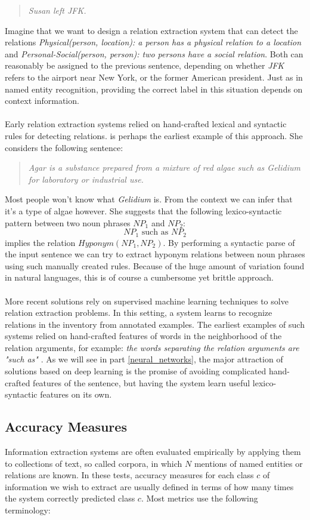 \begin{quote}
	\textit{Susan left JFK.}
\end{quote}
Imagine that we want to design a relation extraction system that can detect the relations \textit{Physical(person, location): a person has a physical relation to a location} and \textit{Personal-Social(person, person): two persons have a social relation}. Both can reasonably be assigned to the previous sentence, depending on whether \textit{JFK} refers to the airport near New York, or the former American president. Just as in named entity recognition, providing the correct label in this situation depends on context information.
\\\\
Early relation extraction systems relied on hand-crafted lexical and syntactic rules for detecting relations. \citet{hearst1992} is perhaps the earliest example of this approach. She considers the following sentence:
\begin{quote}
	\textit{Agar is a substance prepared from a mixture of red algae such as Gelidium for laboratory or industrial use.}
\end{quote}
Most people won't know what \textit{Gelidium} is. From the context we can infer that it's a type of algae however. She suggests that the following lexico-syntactic pattern between two noun phrases $NP_1$ and $NP_2$:
$$
NP_1\text{ such as }NP_2
$$
implies the relation $Hyponym(NP_1, NP_2)$. By performing a syntactic parse of the input sentence we can try to extract hyponym relations between noun phrases using such manually created rules. Because of the huge amount of variation found in natural languages, this is of course a cumbersome yet brittle approach.
\\\\
More recent solutions rely on supervised machine learning techniques to solve relation extraction problems. In this setting, a system learns to recognize relations in the inventory from annotated examples. The earliest examples of such systems relied on hand-crafted features of words in the neighborhood of the relation arguments, for example: \textit{the words separating the relation arguments are "such as"} \citep{jurafsky09}. As we will see in part \ref{neural_networks}, the major attraction of solutions based on deep learning is the promise of avoiding complicated hand-crafted features of the sentence, but having the system learn useful lexico-syntactic features on its own.

\subsection{Accuracy Measures}
Information extraction systems are often evaluated empirically by applying them to collections of text, so called corpora, in which $N$ mentions of named entities or relations are known. In these tests, accuracy measures for each class $c$ of information we wish to extract are usually defined in terms of how many times the system correctly predicted class $c$. Most metrics use the following terminology:

